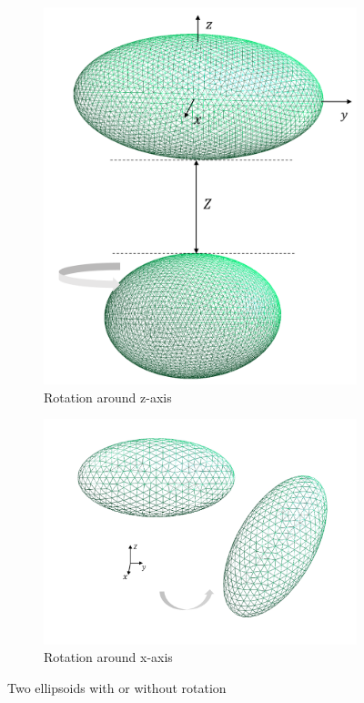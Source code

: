 \begin{figure}[H]
\begin{subfigure}{.5\linewidth}
    \includegraphics[scale = 0.4]{figures/Ellipsoid_z_axis}
    \caption{Rotation around z-axis}
    \label{Rotation around z-axis}
    \end{subfigure}%
    \begin{subfigure}{.5\linewidth}
    \centering
    \includegraphics[scale = 0.4]{figures/Ellipsoid_x_axis}
    \caption{Rotation around x-axis}
    \label{Rotation around x-axis}
    \end{subfigure}
    \caption{Two ellipsoids with or without rotation}
    \label{Two ellipsoids}
    \end{figure}


